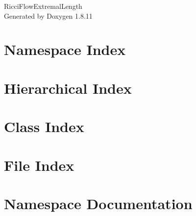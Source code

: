 \documentclass[twoside]{book}
\newcommand{\+}{\discretionary{\mbox{\scriptsize$\hookleftarrow$}}{}{}}
\newcommand{\clearemptydoublepage}{%
  \newpage{\pagestyle{empty}\cleardoublepage}%
}
\begin{document}
\hypersetup{pageanchor=false,
             bookmarksnumbered=true,
             pdfencoding=unicode
            }
\begin{titlepage}
\vspace*{7cm}
\begin{center}%
{\Large Ricci\+Flow\+Extremal\+Length }\\
\vspace*{1cm}
{\large Generated by Doxygen 1.8.11}\\
\end{center}
\end{titlepage}
\clearemptydoublepage
\tableofcontents
\clearemptydoublepage
{}
\hypersetup{pageanchor=true}

\chapter{Namespace Index}

\chapter{Hierarchical Index}

\chapter{Class Index}

\chapter{File Index}

\chapter{Namespace Documentation}


\end{document}
